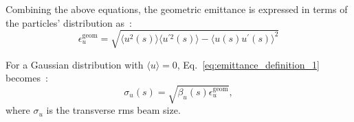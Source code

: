  Combining the above equations, the geometric emittance is expressed in terms of the particles' distribution as~\cite{wolski2014}:
 \begin{equation}\label{eq:geometric_emittance_v2}
     \epsilon^{\mathrm{geom}}_u = \sqrt{\langle u^2(s) \rangle \langle u^{\prime 2}(s) \rangle- \langle u (s)u^{\prime}(s) \rangle ^2}
 \end{equation}
 
For a Gaussian distribution with $\langle u \rangle=0$, Eq.~\eqref{eq:emittance_definition_1} becomes~\cite{wolski2014}: 
\begin{equation}\label{eq:emittance_beam_size}
    \sigma_u(s) = \sqrt{\beta_u(s) \epsilon^{\mathrm{geom}}_u},
\end{equation}
where $\sigma_u$ is the transverse rms beam size.



 
 

